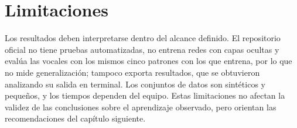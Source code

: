 \section{Limitaciones}
Los resultados deben interpretarse dentro del alcance definido. El repositorio oficial no tiene pruebas automatizadas, no entrena redes con capas ocultas y evalúa las vocales con los mismos cinco patrones con los que entrena, por lo que no mide generalización; tampoco exporta resultados, que se obtuvieron analizando su salida en terminal. Los conjuntos de datos son sintéticos y pequeños, y los tiempos dependen del equipo. Estas limitaciones no afectan la validez de las conclusiones sobre el aprendizaje observado, pero orientan las recomendaciones del capítulo siguiente.
